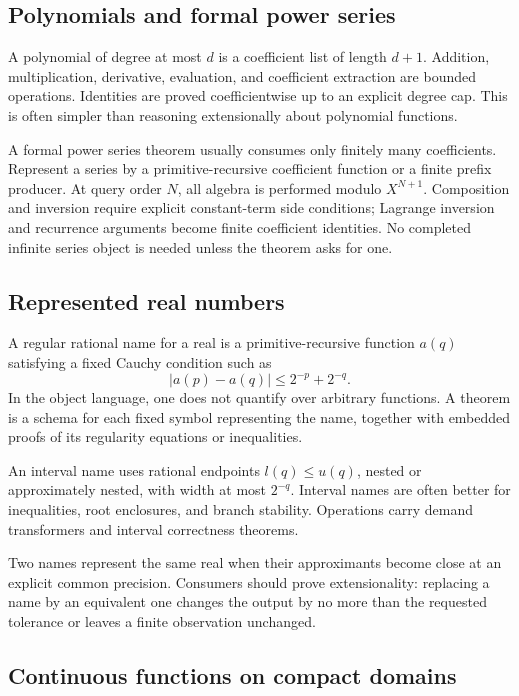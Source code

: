 \subsection{Polynomials and formal power series}

A polynomial of degree at most \(d\) is a coefficient list of length \(d+1\).  Addition, multiplication, derivative, evaluation, and coefficient extraction are bounded operations.  Identities are proved coefficientwise up to an explicit degree cap.  This is often simpler than reasoning extensionally about polynomial functions.

A formal power series theorem usually consumes only finitely many coefficients.  Represent a series by a primitive-recursive coefficient function or a finite prefix producer.  At query order \(N\), all algebra is performed modulo \(X^{N+1}\).  Composition and inversion require explicit constant-term side conditions; Lagrange inversion and recurrence arguments become finite coefficient identities.  No completed infinite series object is needed unless the theorem asks for one.

\subsection{Represented real numbers}

A regular rational name for a real is a primitive-recursive function \(a(q)\) satisfying a fixed Cauchy condition such as
\[
 |a(p)-a(q)|\le 2^{-p}+2^{-q}.
\]
In the object language, one does not quantify over arbitrary functions.  A theorem is a schema for each fixed  symbol representing the name, together with embedded proofs of its regularity equations or inequalities.

An interval name uses rational endpoints \(l(q)\le u(q)\), nested or approximately nested, with width at most \(2^{-q}\).  Interval names are often better for inequalities, root enclosures, and branch stability.  Operations carry demand transformers and interval correctness theorems.

Two names represent the same real when their approximants become close at an explicit common precision.  Consumers should prove extensionality: replacing a name by an equivalent one changes the output by no more than the requested tolerance or leaves a finite observation unchanged.

\subsection{Continuous functions on compact domains}

